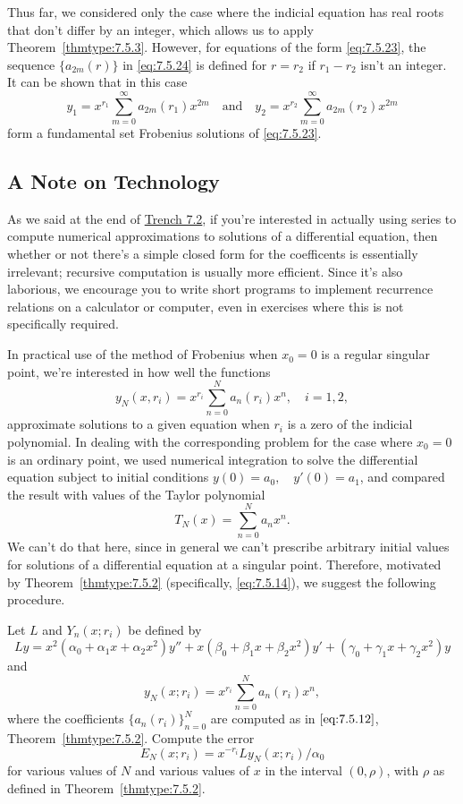 \documentclass{ximera}
\begin{document}
\begin{remark}
Thus far, we considered only the case where the indicial equation
has real roots that don't differ by an integer, which allows us to
apply Theorem~\ref{thmtype:7.5.3}. However, for equations of the form
\eqref{eq:7.5.23}, the sequence $\{a_{2m}(r)\}$ in \eqref{eq:7.5.24} is
defined for $r=r_2$ if $r_1-r_2$ isn't  an  integer. It can be
shown %
that in this case
$$
y_1=x^{r_1}\sum_{m=0}^\infty a_{2m}(r_1)x^{2m}\quad \mbox{and}\quad y_2=x^{r_2}\sum_{m=0}^\infty a_{2m}(r_2)x^{2m}
$$
form a fundamental set  Frobenius solutions of \eqref{eq:7.5.23}.
\end{remark}

\subsection*{A Note on Technology}
As we said at the end of \href{https://ximera.osu.edu/ode/main/seriesSolNearOrdinaryPtI/seriesSolNearOrdinaryPtI}{Trench 7.2}, if you're interested in
actually using series to compute numerical approximations to solutions
of a differential equation, then whether or not there's a simple
closed form for the coefficents is essentially irrelevant;   recursive
computation is usually more efficient. Since it's also laborious, we
encourage you to write short programs to implement recurrence
relations on a calculator or computer, even in exercises where this is
not specifically required.

In practical use of the method of Frobenius when $x_0=0$ is a regular
singular point, we're interested in how well the functions
$$
y_N(x,r_i)=x^{r_i}\sum_{n=0}^N a_n(r_i)x^n,\quad i=1,2,
$$
approximate solutions to a given equation when $r_i$ is a zero of the
indicial polynomial. In dealing with the corresponding problem for the
case where $x_0=0$ is an ordinary point, we used numerical integration
to solve the differential equation subject to initial conditions
$y(0)=a_0,\quad y'(0)=a_1$, and compared the result with values of the
Taylor polynomial
$$
T_N(x)=\sum_{n=0}^Na_nx^n.
$$
We can't do that here, since in general we can't prescribe
arbitrary initial values for solutions of a differential equation at a
singular point. Therefore, motivated by Theorem~\ref{thmtype:7.5.2}
(specifically, \eqref{eq:7.5.14}), we suggest the following  procedure.

\begin{procedure}
Let $L$ and
$Y_n(x; r_i)$ be defined by
$$
Ly=
x^2(\alpha_0+\alpha_1x+\alpha_2x^2)y''+x(\beta_0+\beta_1x+\beta_2x^2)y'
+(\gamma_0+\gamma_1x+\gamma_2x^2)y
$$
and
$$
y_N(x;r_i)=x^{r_i}\sum_{n=0}^N a_n(r_i)x^n,
$$
where the coefficients $\{a_n(r_i)\}_{n=0}^N$ are computed as in
$\eqref{eq:7.5.12}$, Theorem~\ref{thmtype:7.5.2}. Compute the error
\begin{equation} \label{eq:7.5.27}
E_N(x;r_i)=x^{-r_i}Ly_N(x;r_i)/\alpha_0
\end{equation}
for various values of $N$ and various values of $x$ in the interval
$(0,\rho)$, with $\rho$ as defined in Theorem~\ref{thmtype:7.5.2}.
\end{procedure}
\end{document}
